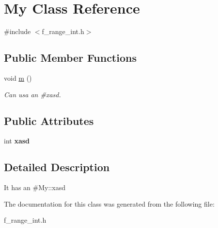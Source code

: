 \hypertarget{class_my}{}\section{My Class Reference}
\label{class_my}


{\ttfamily \#include $<$f\+\_\+range\+\_\+int.\+h$>$}

\subsection*{Public Member Functions}
\begin{DoxyCompactItemize}
\item 
\mbox{\label{class_my_a6cf50bfbcef9084d3ede628f9bd9ea2b}} 
void \mbox{\hyperlink{class_my_a6cf50bfbcef9084d3ede628f9bd9ea2b}{m}} ()
\begin{DoxyCompactList}\small\item\em Can usa an \#xasd. \end{DoxyCompactList}\end{DoxyCompactItemize}
\subsection*{Public Attributes}
\begin{DoxyCompactItemize}
\item 
\mbox{\label{class_my_a166c60b5411de6d1c0ab5368a6ed45a3}} 
int {\bfseries xasd}
\end{DoxyCompactItemize}


\subsection{Detailed Description}
It has an \#\+My\+::xasd 

The documentation for this class was generated from the following file\+:\begin{DoxyCompactItemize}
\item 
f\+\_\+range\+\_\+int.\+h\end{DoxyCompactItemize}
